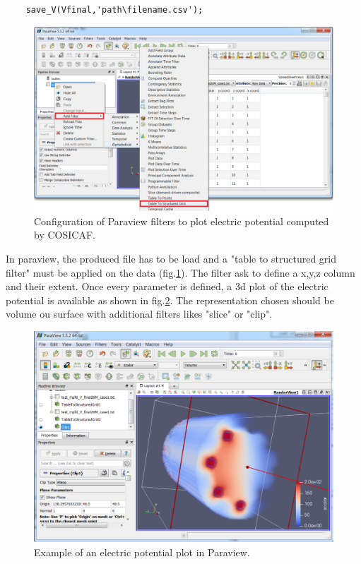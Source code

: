 \documentclass[10pt]{article}
\begin{document}
	\begin{lstlisting}
	save_V(Vfinal,'path\filename.csv');
	\end{lstlisting}
		\begin{figure}[!htb]
			\centering
			\includegraphics[scale=0.5]{paraview_config.pdf}
			\caption{Configuration of Paraview filters to plot electric potential computed by COSICAF.}   
			\label{fig:paraview_config}
		\end{figure}
	In paraview, the produced file has to be load and a "table to structured grid filter" must be applied on the data (fig.\ref{fig:paraview_config}). The filter ask to define a x,y,z column and their extent. Once every parameter is defined, a 3d plot of the electric potential is available as shown in fig.\ref{fig:v_paraview}. The representation chosen should be volume ou surface with additional filters likes "slice" or "clip".
		\begin{figure}[!htb]
			\centering
			\includegraphics[scale=0.5]{paraview.pdf}
			\caption{Example of an electric potential plot in Paraview.}   
			\label{fig:v_paraview}
		\end{figure}
		
\end{document}

